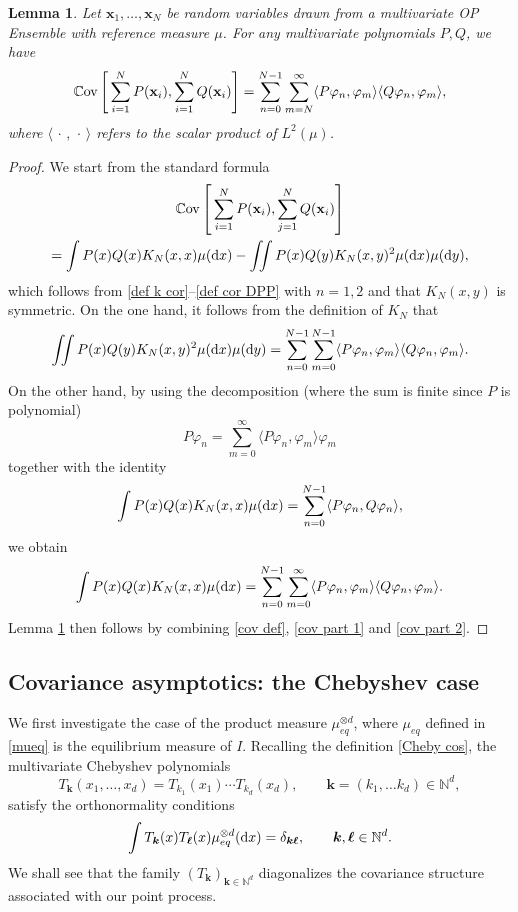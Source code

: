 \documentclass[a4paper,11pt]{article}
\numberwithin{equation}{section}
\newtheorem{lemma}[]{Lemma}
\theoremstyle{definition}
\newcommand{\eq}{\begin{equation}}
\newcommand{\qe}{\end{equation}}
\newcommand{\N}{\mathbb{N}}
\newcommand{\bs}{\boldsymbol}
\newcommand{\bv}{\mathbf}
\newcommand{\mueqd}{\mu_{eq}^{\otimes d}}
\renewcommand{\phi}{\varphi}
\renewcommand{\d}{ {\rm d}}
\begin{document}
\begin{lemma} Let $\bv x_1,\ldots, \bv x_N$ be random variables drawn from a multivariate OP Ensemble with reference measure $\mu$. For any   multivariate polynomials $P,Q$, we have
\label{cov representation}
\[
\mathbb C{\rm ov}\left[\, \sum_{i=1}^NP(\bv x_i),\sum_{i=1}^NQ(\bv x_i)\right]=\sum_{n=0}^{N-1}\sum_{m=N}^\infty \langle P\phi_n,\phi_m\rangle\langle Q\phi_n,\phi_m\rangle,
\]
where $\langle \, \cdot \, , \, \cdot\, \rangle$ refers to the scalar product of $L^2(\mu)$.
\end{lemma}

\begin{proof}
We  start from the standard formula
\begin{multline}
\label{cov def}
\mathbb C{\rm ov} \left[\, \sum_{i=1}^NP(\bv x_i),\sum_{j=1}^NQ(\bv x_i)\right]\\
=\int P(x)Q(x)K_N(x,x)\mu(\d x)-\iint P(x)Q(y)K_N(x,y)^2\mu(\d x)\mu(\d y),
\end{multline}
which follows from \eqref{def k cor}--\eqref{def cor DPP} with $n=1,2$ and that $K_N(x,y)$ is symmetric.
On the one hand, it  follows from the definition of $K_N$ that
\eq
\label{cov part 1}
\iint P(x)Q(y)K_N(x,y)^2\mu(\d x)\mu(\d y)=\sum_{n=0}^{N-1}\sum_{m=0}^{N-1}\langle P\phi_n,\phi_m\rangle\langle Q\phi_n,\phi_m\rangle.
\qe
On the other hand, by using the decomposition (where the sum is finite since $P$ is polynomial)
\[
P\phi_n=\sum_{m=0}^\infty\langle P\phi_n,\phi_m\rangle \phi_m
\]
together with the identity
\[
\int P(x)Q(x)K_N(x,x)\mu(\d x)=\sum_{n=0}^{N-1}\langle P\phi_n,Q\phi_n\rangle,
\]
we obtain
\eq
\label{cov part 2}
\int P(x)Q(x)K_N(x,x)\mu(\d x)=\sum_{n=0}^{N-1}\sum_{m=0}^\infty\langle P\phi_n,\phi_m\rangle\langle Q\phi_n,\phi_m\rangle.
\qe
Lemma \ref{cov representation} then follows by combining \eqref{cov def}, \eqref{cov part 1} and \eqref{cov part 2}.
\end{proof}





\subsection{Covariance asymptotics: the Chebyshev case}
\label{section Cov Cheby}

We first investigate the case of the product measure $\mu^{\otimes d}_{eq}$,
where $\mu_{eq}$ defined in \eqref{mueq} is the equilibrium measure of $I$.
Recalling the definition \eqref{Cheby cos}, the multivariate Chebyshev polynomials
\eq
\label{multivariate Cheby}
T_{\bs k}(x_1,\ldots,x_d)=T_{k_1}(x_1)\cdots T_{k_d}(x_d),\qquad \bs k=(k_1,\ldots k_d)\in\N^d,
\qe
satisfy the orthonormality conditions
$$
\int T_{\bs k}(x)T_{\bs \ell}(x)\mueqd(\d x)=\delta_{\bs k \bs \ell},\qquad \bs k ,\bs \ell\in\N^d.
$$
We shall see that the family $(T_{\bs k})_{\bs k\in\N^d}$ diagonalizes the
covariance structure associated with our point process.
\end{document}

